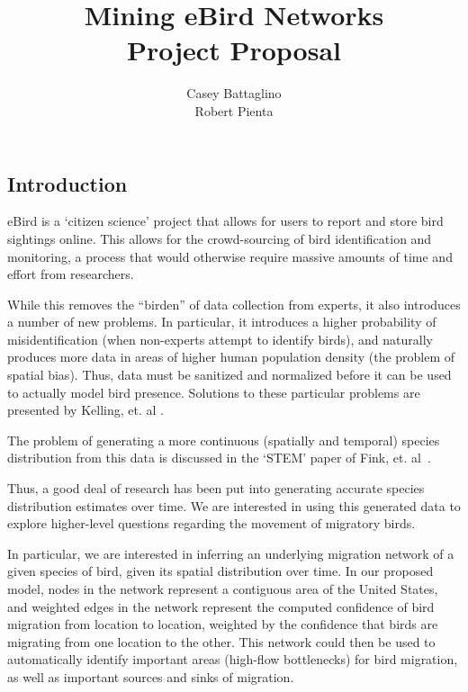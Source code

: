 \documentclass[11pt]{article}
\title{Mining eBird Networks\\ Project Proposal\vspace{-8pt}}
\author{Casey Battaglino\\Robert Pienta}
\date{}
\newcommand{\tod}[1]{\textcolor{red}{[#1]}}
\begin{document}
\maketitle
\begin{multicols}{2}
\section{Introduction} \vspace{-10 pt}
eBird\cite{DBLP:conf/iaai/KellingGFLWYDG12} is a `citizen science' project that allows for users to report and store bird sightings online. This allows for the crowd-sourcing of bird identification and monitoring, a process that would otherwise require massive amounts of time and effort from researchers. 

While this removes the ``birden'' of data collection from experts, it also introduces a number of new problems. In particular, it introduces a higher probability of misidentification (when non-experts attempt to identify birds), and naturally produces more data in areas of higher human population density (the problem of spatial bias). Thus, data must be sanitized and normalized before it can be used to actually model bird presence. Solutions to these particular problems are presented by Kelling, et. al \cite{DBLP:conf/iaai/KellingGFLWYDG12}.

The problem of generating a more continuous (spatially and temporal) species distribution from this data is discussed in the `STEM' paper of Fink, et. al~\cite{stem}.

Thus, a good deal of research has been put into generating accurate species distribution estimates over time. We are interested in using this generated data to explore higher-level questions regarding the movement of migratory birds. 

In particular, we are interested in inferring an underlying migration network of a given species of bird, given its spatial distribution over time. In our proposed model, nodes in the network represent a contiguous area of the United States, and weighted edges in the network represent the computed confidence of bird migration from location to location, weighted by the confidence that birds are migrating from one location to the other. This network could then be used to automatically identify important areas (high-flow bottlenecks) for bird migration, as well as important sources and sinks of migration. 


\end{multicols}
\end{document}
